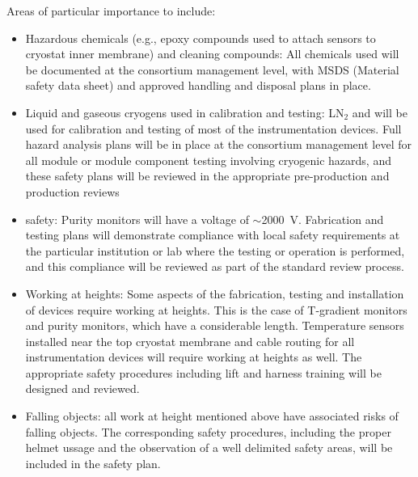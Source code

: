 Areas of particular importance to  include:
\begin{itemize}
\item Hazardous chemicals (e.g., epoxy compounds used to attach sensors to cryostat inner membrane) and cleaning compounds:
  All chemicals used will be documented at the consortium management level, with MSDS (Material safety data sheet) and approved handling and disposal plans in place.

\item Liquid and gaseous cryogens used in calibration and testing: LN$_2$ and \lar will be used for calibration and testing of most of the instrumentation devices.
  Full hazard analysis plans will be in place at the consortium management level for all module or
  module component testing involving cryogenic hazards, and these safety plans will be reviewed in the appropriate pre-production and production reviews

\item {} safety:  Purity monitors will have a voltage of $\sim$\SI{2000}{V}. Fabrication and testing plans will demonstrate compliance with local
   safety requirements at the particular institution or lab where the testing or operation is performed, and this compliance will be reviewed as part of the standard review process.


\item Working at heights: Some aspects of the fabrication, testing and installation of  devices require working at heights. This is the 
  case of T-gradient monitors and purity monitors, which have a considerable length. Temperature sensors installed near the top cryostat membrane and cable routing for all instrumentation devices
  will require working at heights as well. The appropriate safety procedures including lift and harness training will be designed and reviewed. 
  
\item Falling objects: all work at height mentioned above have associated risks of falling objects. The corresponding safety procedures, including the proper helmet ussage 
  and the observation of a well delimited safety areas, will be included in the safety plan. 
\end{itemize}
  

  

